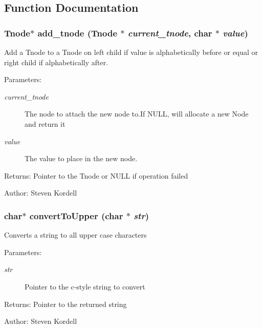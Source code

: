 \subsection{Function Documentation}
\subsubsection{\setlength{\rightskip}{0pt plus 5cm}\bf{Tnode}$\ast$ add\_\-tnode (\bf{Tnode} $\ast$ {\em current\_\-tnode}, char $\ast$ {\em value})}\label{tree_8h_4bfce116a958985cbce7618d701f8197}


Add a Tnode to a Tnode on left child if value is alphabetically before or equal or right child if alphabetically after. \begin{Desc}
\item[Parameters:]
\begin{description}
\item[{\em current\_\-tnode}]The node to attach the new node to.If NULL, will allocate a new Node and return it \item[{\em value}]The value to place in the new node. \end{description}
\end{Desc}
\begin{Desc}
\item[Returns:]Pointer to the Tnode or NULL if operation failed \end{Desc}
\begin{Desc}
\item[Author:]Steven Kordell \end{Desc}
\subsubsection{\setlength{\rightskip}{0pt plus 5cm}char$\ast$ convert\-To\-Upper (char $\ast$ {\em str})}\label{tree_8h_55598c5fb796fddbe31347850d78d707}


Converts a string to all upper case characters \begin{Desc}
\item[Parameters:]
\begin{description}
\item[{\em str}]Pointer to the c-style string to convert \end{description}
\end{Desc}
\begin{Desc}
\item[Returns:]Pointer to the returned string \end{Desc}
\begin{Desc}
\item[Author:]Steven Kordell \end{Desc}
